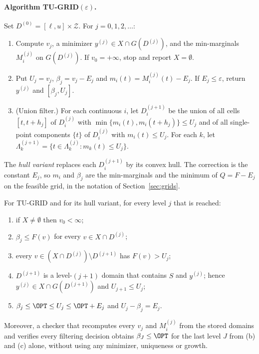 \paragraph{Algorithm TU-GRID$(\varepsilon)$.}
Set $D^{(0)}=[\ell,u]\times\mathcal Z$. For $j=0,1,2,\dots$:
\begin{enumerate}[label=(\arabic*)]
\item Compute $v_j$, a minimizer $y^{(j)}\in X\cap G(D^{(j)})$, and the
min-marginals $M^{(j)}_i$ on $G(D^{(j)})$. If $v_0=+\infty$, stop and report
$X=\emptyset$.
\item Put $U_j=v_j$, $\beta_j=v_j-E_j$ and $m_i(t)=M^{(j)}_i(t)-E_j$. If
$E_j\le\varepsilon$, return $y^{(j)}$ and $[\beta_j,U_j]$.
\item (Union filter.) For each continuous $i$, let $D^{(j+1)}_i$ be the union
of all cells $[t,t+h_j]$ of $D^{(j)}_i$ with
$\min\{m_i(t),m_i(t+h_j)\}\le U_j$ and of all single-point components
$\{t\}$ of $D^{(j)}_i$ with $m_i(t)\le U_j$. For each $k$, let
$\Lambda^{(j+1)}_k=\{t\in\Lambda^{(j)}_k:m_{k}(t)\le U_j\}$.
\end{enumerate}
The \emph{hull variant} replaces each $D^{(j+1)}_i$ by its convex hull. The
correction is the constant $E_j$, so $m_i$ and $\beta_j$ are the min-marginals
and the minimum of $Q=F-E_j$ on the feasible grid, in the notation of
Section~\ref{sec:grids}.

\begin{proposition}[Soundness]\label{prop:tu-sound}
For TU-GRID and for its hull variant, for every level $j$ that is reached:
\begin{enumerate}[label=(\alph*)]
\item if $X\ne\emptyset$ then $v_0<\infty$;
\item $\beta_j\le F(v)$ for every $v\in X\cap D^{(j)}$;
\item every $v\in(X\cap D^{(j)})\setminus D^{(j+1)}$ has $F(v)>U_j$;
\item $D^{(j+1)}$ is a level-$(j+1)$ domain that contains $S$ and $y^{(j)}$;
hence $y^{(j)}\in X\cap G(D^{(j+1)})$ and $U_{j+1}\le U_j$;
\item $\beta_j\le\OPT\le U_j\le\OPT+E_j$ and $U_j-\beta_j=E_j$.
\end{enumerate}
Moreover, a checker that recomputes every $v_j$ and $M^{(j)}_i$ from the
stored domains and verifies every filtering decision obtains
$\beta_J\le\OPT$ for the last level $J$ from (b) and (c) alone, without
using any minimizer, uniqueness or growth.
\end{proposition}

